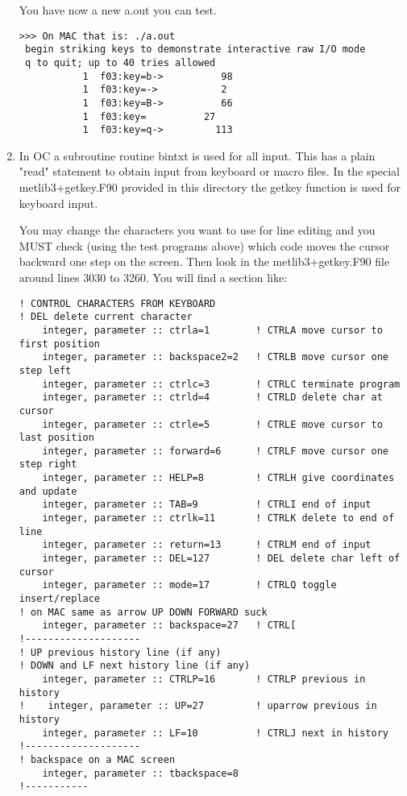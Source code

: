 \documentclass[12pt]{article}
\begin{document}
\begin{enumerate}
You have now a new a.out you can test.

\begin{verbatim}
>>> On MAC that is: ./a.out
 begin striking keys to demonstrate interactive raw I/O mode
 q to quit; up to 40 tries allowed
           1  f03:key=b->          98
           1  f03:key=->           2
           1  f03:key=B->          66
           1  f03:key=          27
           1  f03:key=q->         113
\end{verbatim}

\item In OC a subroutine routine bintxt is used for all input.  This
has a plain "read" statement to obtain input from keyboard or macro
files.  In the special metlib3+getkey.F90 provided in this directory
the getkey function is used for keyboard input.

You may change the characters you want to use for line editing and you
MUST check (using the test programs above) which code moves the cursor
backward one step on the screen.  Then look in the metlib3+getkey.F90
file around lines 3030 to 3260.  You will find a section like:

\begin{verbatim}
! CONTROL CHARACTERS FROM KEYBOARD
! DEL delete current character
    integer, parameter :: ctrla=1        ! CTRLA move cursor to first position
    integer, parameter :: backspace2=2   ! CTRLB move cursor one step left
    integer, parameter :: ctrlc=3        ! CTRLC terminate program
    integer, parameter :: ctrld=4        ! CTRLD delete char at cursor
    integer, parameter :: ctrle=5        ! CTRLE move cursor to last position
    integer, parameter :: forward=6      ! CTRLF move cursor one step right
    integer, parameter :: HELP=8         ! CTRLH give coordinates and update
    integer, parameter :: TAB=9          ! CTRLI end of input
    integer, parameter :: ctrlk=11       ! CTRLK delete to end of line
    integer, parameter :: return=13      ! CTRLM end of input
    integer, parameter :: DEL=127        ! DEL delete char left of cursor
    integer, parameter :: mode=17        ! CTRLQ toggle insert/replace
! on MAC same as arrow UP DOWN FORWARD suck
    integer, parameter :: backspace=27   ! CTRL[ 
!--------------------  
! UP previous history line (if any)
! DOWN and LF next history line (if any)
    integer, parameter :: CTRLP=16       ! CTRLP previous in history
!    integer, parameter :: UP=27         ! uparrow previous in history
    integer, parameter :: LF=10          ! CTRLJ next in history
!--------------------
! backspace on a MAC screen
    integer, parameter :: tbackspace=8
!-----------
\end{verbatim}


\end{enumerate}
\end{document}
